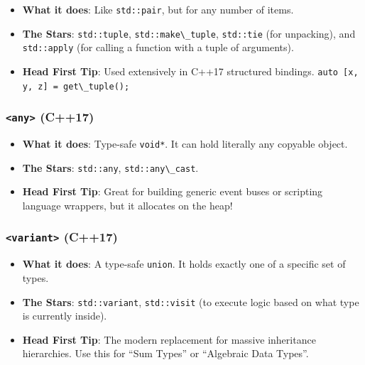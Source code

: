 \begin{itemize}
\tightlist
\item
  \textbf{What it does}: Like \passthrough{\lstinline!std::pair!}, but
  for any number of items.
\item
  \textbf{The Stars}: \passthrough{\lstinline!std::tuple!},
  \passthrough{\lstinline!std::make\_tuple!},
  \passthrough{\lstinline!std::tie!} (for unpacking), and
  \passthrough{\lstinline!std::apply!} (for calling a function with a
  tuple of arguments).
\item
  \textbf{Head First Tip}: Used extensively in C++17 structured
  bindings. \passthrough{\lstinline!auto [x, y, z] = get\_tuple();!}
\end{itemize}

\hypertarget{any-c17}{%
\subsubsection{\texorpdfstring{\texttt{\textless{}any\textgreater{}}
(C++17)}{\textless any\textgreater{} (C++17)}}\label{any-c17}}

\begin{itemize}
\tightlist
\item
  \textbf{What it does}: Type-safe \passthrough{\lstinline!void*!}. It
  can hold literally any copyable object.
\item
  \textbf{The Stars}: \passthrough{\lstinline!std::any!},
  \passthrough{\lstinline!std::any\_cast!}.
\item
  \textbf{Head First Tip}: Great for building generic event buses or
  scripting language wrappers, but it allocates on the heap!
\end{itemize}

\hypertarget{variant-c17}{%
\subsubsection{\texorpdfstring{\texttt{\textless{}variant\textgreater{}}
(C++17)}{\textless variant\textgreater{} (C++17)}}\label{variant-c17}}

\begin{itemize}
\tightlist
\item
  \textbf{What it does}: A type-safe \passthrough{\lstinline!union!}. It
  holds exactly one of a specific set of types.
\item
  \textbf{The Stars}: \passthrough{\lstinline!std::variant!},
  \passthrough{\lstinline!std::visit!} (to execute logic based on what
  type is currently inside).
\item
  \textbf{Head First Tip}: The modern replacement for massive
  inheritance hierarchies. Use this for ``Sum Types'' or ``Algebraic
  Data Types''.
\end{itemize}

